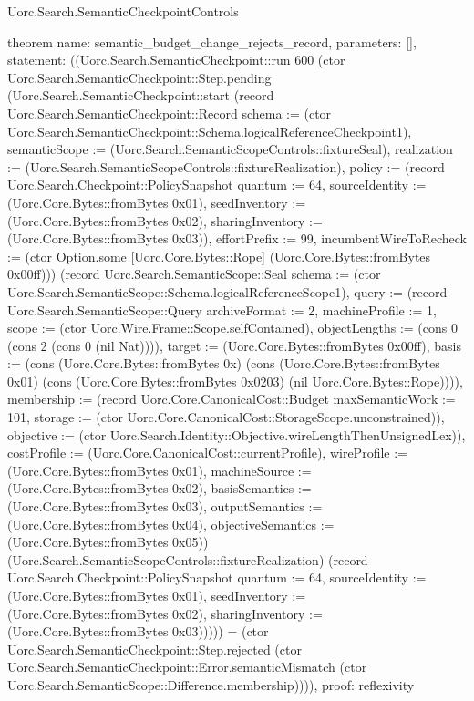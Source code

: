 \begin{lexlean}{Uorc.Search.SemanticCheckpointControls}
\begin{semanticmodule}
theorem{
  name: semantic_budget_change_rejects_record,
  parameters: [],
  statement: ((Uorc.Search.SemanticCheckpoint::run 600 (ctor Uorc.Search.SemanticCheckpoint::Step.pending (Uorc.Search.SemanticCheckpoint::start (record Uorc.Search.SemanticCheckpoint::Record {schema := (ctor Uorc.Search.SemanticCheckpoint::Schema.logicalReferenceCheckpoint1), semanticScope := (Uorc.Search.SemanticScopeControls::fixtureSeal), realization := (Uorc.Search.SemanticScopeControls::fixtureRealization), policy := (record Uorc.Search.Checkpoint::PolicySnapshot {quantum := 64, sourceIdentity := (Uorc.Core.Bytes::fromBytes 0x01), seedInventory := (Uorc.Core.Bytes::fromBytes 0x02), sharingInventory := (Uorc.Core.Bytes::fromBytes 0x03)}), effortPrefix := 99, incumbentWireToRecheck := (ctor Option.some [Uorc.Core.Bytes::Rope] (Uorc.Core.Bytes::fromBytes 0x00ff))}) (record Uorc.Search.SemanticScope::Seal {schema := (ctor Uorc.Search.SemanticScope::Schema.logicalReferenceScope1), query := (record Uorc.Search.SemanticScope::Query {archiveFormat := 2, machineProfile := 1, scope := (ctor Uorc.Wire.Frame::Scope.selfContained), objectLengths := (cons 0 (cons 2 (cons 0 (nil Nat)))), target := (Uorc.Core.Bytes::fromBytes 0x00ff), basis := (cons (Uorc.Core.Bytes::fromBytes 0x) (cons (Uorc.Core.Bytes::fromBytes 0x01) (cons (Uorc.Core.Bytes::fromBytes 0x0203) (nil Uorc.Core.Bytes::Rope)))), membership := (record Uorc.Core.CanonicalCost::Budget {maxSemanticWork := 101, storage := (ctor Uorc.Core.CanonicalCost::StorageScope.unconstrained)}), objective := (ctor Uorc.Search.Identity::Objective.wireLengthThenUnsignedLex)}), costProfile := (Uorc.Core.CanonicalCost::currentProfile), wireProfile := (Uorc.Core.Bytes::fromBytes 0x01), machineSource := (Uorc.Core.Bytes::fromBytes 0x02), basisSemantics := (Uorc.Core.Bytes::fromBytes 0x03), outputSemantics := (Uorc.Core.Bytes::fromBytes 0x04), objectiveSemantics := (Uorc.Core.Bytes::fromBytes 0x05)}) (Uorc.Search.SemanticScopeControls::fixtureRealization) (record Uorc.Search.Checkpoint::PolicySnapshot {quantum := 64, sourceIdentity := (Uorc.Core.Bytes::fromBytes 0x01), seedInventory := (Uorc.Core.Bytes::fromBytes 0x02), sharingInventory := (Uorc.Core.Bytes::fromBytes 0x03)})))) = (ctor Uorc.Search.SemanticCheckpoint::Step.rejected (ctor Uorc.Search.SemanticCheckpoint::Error.semanticMismatch (ctor Uorc.Search.SemanticScope::Difference.membership)))),
  proof: reflexivity{}
}


\end{semanticmodule}
\end{lexlean}
